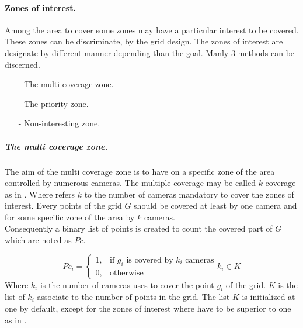 \paragraph*{Zones of interest.} 
Among the area to cover some zones may have a particular interest to be covered. These zones can be discriminate, by the grid design. 
The zones of interest are designate by different manner depending than the goal. Manly 3 methods can be discerned.
\begin{itemize}
	\item[-]	The multi coverage zone. 
	\item[-]	The priority zone.  
	\item[-]	Non-interesting zone.
\end{itemize}
 

\subparagraph{The multi coverage zone.}
The aim  of the multi coverage zone is to have on a specific zone of the area controlled by numerous cameras.  The multiple coverage may be called $k$-coverage as in \cite{174*zhang2016}. Where refers $k$ to the number of cameras mandatory to cover the zones of interest. 
Every points of the grid $G$ should be covered at least by one camera and for some specific zone of the area by $k$ cameras.\\
 Consequently a binary list of points is created to count the covered part of $G$ which are noted as $Pc$.

\begin{equation}\label{eq:PciK}
Pc_i= \begin{cases} 1, & \mbox{if } g_i\mbox{ is covered by $k_i$ cameras} \\ 0, & \mbox{otherwise}   \end{cases}k_i \in K
\end{equation}
Where $k_i$ is the number of cameras uses to cover the point $g_i$ of the grid. $K$ is the list of $k_i$ associate to the number of points in the grid. The list $K$ is initialized at one by default, except for the zones of interest where have to be superior to one as in \cite{82*chrysostomou2012}. 

